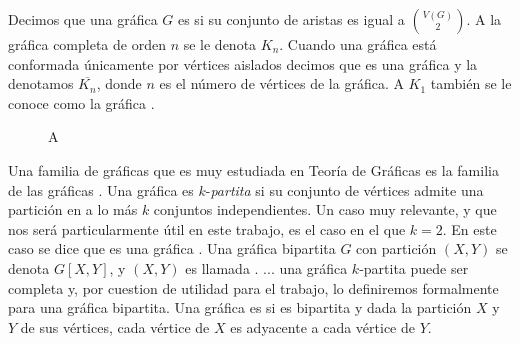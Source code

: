 Decimos que una gr\'afica $G$ es  si su conjunto
de aristas es igual a $\binom{V(G)}{2}$. A la gr\'afica completa de orden $n$ se
le denota $K_n$. Cuando una gr\'afica est\'a conformada \'unicamente por
v\'ertices aislados decimos que es una gr\'afica 
y la denotamos $\overline{K_n}$, donde $n$ es el n\'umero de v\'ertices de la
gr\'afica. A $K_1$ tambi\'en se le conoce como la gr\'afica  .


\begin{figure}[ht!]
    \centering
        \caption{A}
        \label{fig:ex-completa}
    \end{figure}

Una familia de gr\'aficas que es muy estudiada en Teor\'ia de Gr\'aficas es la
familia de las gr\'aficas . Una gr\'afica es
$k$-\textit{partita} si su conjunto de v\'ertices admite una partici\'on en a lo
m\'as $k$ conjuntos independientes. Un caso muy relevante, y que nos ser\'a
particularmente \'util en este trabajo, es el caso en el que $k=2$. En este caso
se dice que es una gr\'afica . Una gr\'afica
bipartita $G$ con partici\'on $(X,Y)$ se denota $G[X,Y]$, y $(X,Y)$ es llamada
.
... una gr\'afica $k$-partita puede ser completa y, por cuestion de utilidad
para el trabajo, lo definiremos formalmente para una gr\'afica bipartita. Una
gr\'afica es  si es bipartita y dada la
partici\'on $X$ y $Y$ de sus v\'ertices, cada v\'ertice de $X$ es adyacente a
cada v\'ertice de $Y$. 

